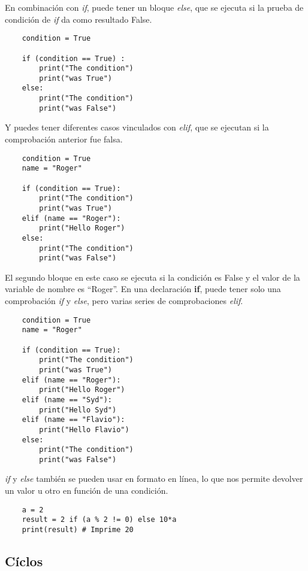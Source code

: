 \documentclass[12pt]{article}
\theoremstyle{definition}
\begin{document}
    En combinación con \textit{if}, puede tener un bloque \textit{else}, que se ejecuta si la prueba de condición de \textit{if} da como resultado False.
    \begin{lstlisting}
    condition = True

    if (condition == True) :
        print("The condition")
        print("was True")
    else:
        print("The condition")
        print("was False")
    \end{lstlisting}

    Y puedes tener diferentes casos vinculados con \textit{elif}, que se ejecutan si la comprobación anterior fue falsa.

    \begin{lstlisting}
    condition = True
    name = "Roger"

    if (condition == True):
        print("The condition")
        print("was True")
    elif (name == "Roger"):
        print("Hello Roger")
    else:
        print("The condition")
        print("was False")
    \end{lstlisting}

    El segundo bloque en este caso se ejecuta si la condición es False y el valor de la variable de nombre es ``Roger''.
    En una declaración \textbf{if}, puede tener solo una comprobación \textit{if} y \textit{else}, pero varias series de comprobaciones \textit{elif}.

    \begin{lstlisting}
    condition = True
    name = "Roger"

    if (condition == True):
        print("The condition")
        print("was True")
    elif (name == "Roger"):
        print("Hello Roger")
    elif (name == "Syd"):
        print("Hello Syd")
    elif (name == "Flavio"):
        print("Hello Flavio")
    else:
        print("The condition")
        print("was False")
    \end{lstlisting}

    \textit{if} y \textit{else} también se pueden usar en formato en línea, lo que nos permite devolver un
    valor u otro en función de una condición.

    \begin{lstlisting}
    a = 2
    result = 2 if (a % 2 != 0) else 10*a
    print(result) # Imprime 20
    \end{lstlisting}


    \subsection{Cíclos}
\end{document}
